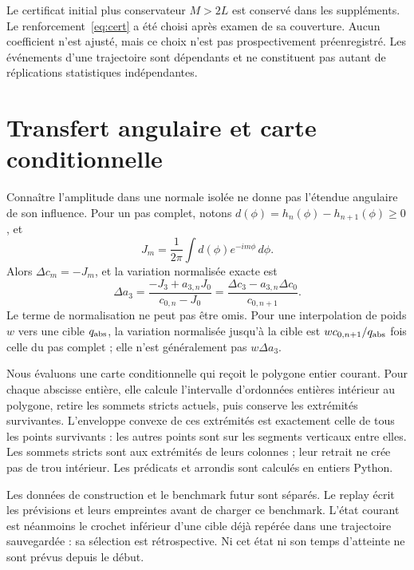\documentclass[11pt,a4paper]{article}
\begin{document}
Le certificat initial plus conservateur $M>2L$ est conservé dans les suppléments. Le renforcement~\eqref{eq:cert} a été choisi après examen de sa couverture. Aucun coefficient n'est ajusté, mais ce choix n'est pas prospectivement préenregistré. Les événements d'une trajectoire sont dépendants et ne constituent pas autant de réplications statistiques indépendantes.

\newpage
\section{Transfert angulaire et carte conditionnelle}
Connaître l'amplitude dans une normale isolée ne donne pas l'étendue angulaire de son influence. Pour un pas complet, notons $d(\phi)=h_n(\phi)-h_{n+1}(\phi)\ge0$, et
\begin{equation}
J_m=\frac{1}{2\pi}\int d(\phi)e^{-im\phi}\,d\phi.
\end{equation}
Alors $\Delta c_m=-J_m$, et la variation normalisée exacte est
\begin{equation}\label{eq:delta}
\Delta a_3=\frac{-J_3+a_{3,n}J_0}{c_{0,n}-J_0}
=\frac{\Delta c_3-a_{3,n}\Delta c_0}{c_{0,n+1}}.
\end{equation}
Le terme de normalisation ne peut pas être omis. Pour une interpolation de poids $w$ vers une cible $q_{\rm abs}$, la variation normalisée jusqu'à la cible est $w c_{0,n+1}/q_{\rm abs}$ fois celle du pas complet ; elle n'est généralement pas $w\Delta a_3$.

Nous évaluons une carte conditionnelle qui reçoit le polygone entier courant. Pour chaque abscisse entière, elle calcule l'intervalle d'ordonnées entières intérieur au polygone, retire les sommets stricts actuels, puis conserve les extrémités survivantes. L'enveloppe convexe de ces extrémités est exactement celle de tous les points survivants : les autres points sont sur les segments verticaux entre elles. Les sommets stricts sont aux extrémités de leurs colonnes ; leur retrait ne crée pas de trou intérieur. Les prédicats et arrondis sont calculés en entiers Python.

Les données de construction et le benchmark futur sont séparés. Le replay écrit les prévisions et leurs empreintes avant de charger ce benchmark. L'état courant est néanmoins le crochet inférieur d'une cible déjà repérée dans une trajectoire sauvegardée : sa sélection est rétrospective. Ni cet état ni son temps d'atteinte ne sont prévus depuis le début.
\end{document}
